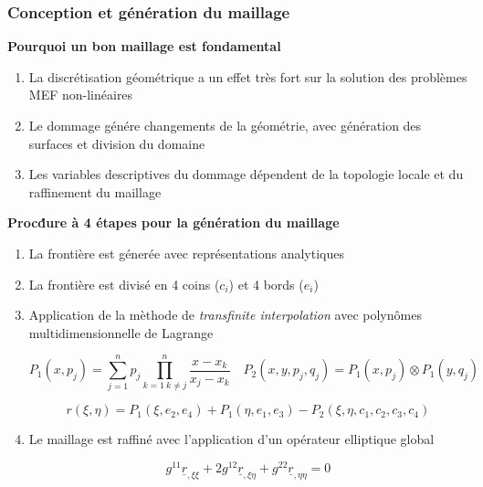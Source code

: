 \documentclass[first,firstsupp,lastsupp,handout,last,hyperref,table]{ETHclass}
\begin{document}
\begin{frame}
\frametitle{\vspace*{0.25cm}\small Conception et g\'en\'eration du maillage}
\vspace{-0.5cm}
\centering
\tiny
\begin{alertblock}{\scriptsize \bf{Pourquoi un bon maillage est fondamental}}
\begin{enumerate}
\item La discr\'etisation g\'eom\'etrique a un effet tr\`es fort sur la solution des probl\`emes MEF non-lin\'eaires 
\item Le dommage g\'en\'ere changements de la g\'eom\'etrie, avec g\'en\'eration des surfaces et division du domaine
\item Les variables descriptives du dommage d\'ependent de la topologie locale et du raffinement du maillage
\end{enumerate}
\end{alertblock}
\begin{alertblock}{\scriptsize \bf{Proc\'dure \`a 4 \'etapes pour la g\'en\'eration du maillage}}
\begin{enumerate}
\item La fronti\`ere est g\'ener\'ee avec repr\'esentations analytiques
\item La fronti\`ere est divisé en 4 coins  ($c_{i}$) et 4 bords ($e_{i}$)
\item Application de la m\`ethode de \textit{transfinite interpolation} avec polyn\^omes multidimensionnelle de Lagrange

\begin{equation*}
P_{1}(x,p_{j})=\sum_{j=1}^{n}p_{j}\prod_{k=1\ k\neq j}^{n}\frac{x-x_{k}}{x_{j}-x_{k}}\quad P_{2}(x,y,p_{j},q_{j})=P_{1}(x,p_{j})\otimes P_{1}(y,q_{j})
\end{equation*}

\begin{equation*}
r(\xi,\eta)=P_{1}(\xi,e_{2},e_{4})+P_{1}(\eta,e_{1},e_{3})- P_{2}(\xi,\eta,c_{1},c_{2},c_{3},c_{4})
\end{equation*}

\item Le maillage est raffiné avec l'application d'un op\'erateur elliptique global

\begin{equation*}
g^{11}\underline{r}_{,\xi\xi}+2g^{12}\underline{r}_{,\xi\eta}+g^{22}\underline{r}_{,\eta\eta}=0
\end{equation*}

\end{enumerate}
\end{alertblock}
\end{frame}
\end{document}
